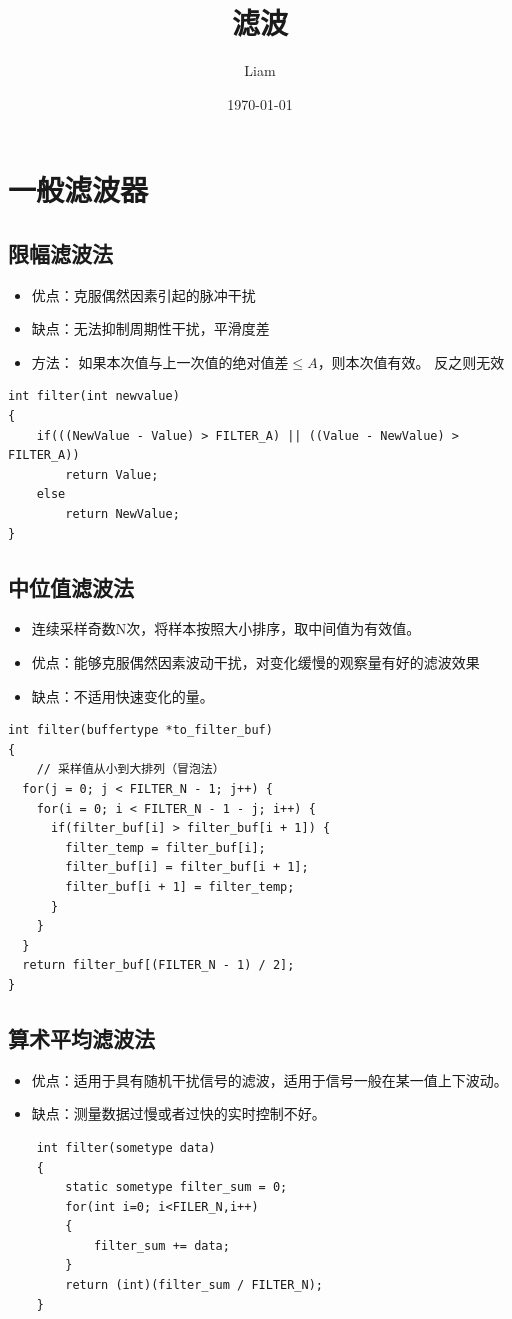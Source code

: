 \documentclass[12pt]{ctexart}
\title{滤波}
\author{Liam}
\date{\today}
\begin{document}
\maketitle
\section{一般滤波器}
\subsection{限幅滤波法}
\begin{itemize}
    \item 优点：克服偶然因素引起的脉冲干扰
    \item 缺点：无法抑制周期性干扰，平滑度差
    \item 方法： 
    \subitem 如果本次值与上一次值的绝对值差$\leq A$，则本次值有效。
    \subitem 反之则无效  
\end{itemize}
\begin{lstlisting}
int filter(int newvalue)
{
    if(((NewValue - Value) > FILTER_A) || ((Value - NewValue) > FILTER_A))
        return Value;
    else
        return NewValue;
}
\end{lstlisting}
\subsection{中位值滤波法}
\begin{itemize}
    \item 连续采样奇数N次，将样本按照大小排序，取中间值为有效值。
    \item 优点：能够克服偶然因素波动干扰，对变化缓慢的观察量有好的滤波效果
    \item 缺点：不适用快速变化的量。
\end{itemize}
\begin{lstlisting}
int filter(buffertype *to_filter_buf)
{
    // 采样值从小到大排列（冒泡法）
  for(j = 0; j < FILTER_N - 1; j++) {
    for(i = 0; i < FILTER_N - 1 - j; i++) {
      if(filter_buf[i] > filter_buf[i + 1]) {
        filter_temp = filter_buf[i];
        filter_buf[i] = filter_buf[i + 1];
        filter_buf[i + 1] = filter_temp;
      }
    }
  }
  return filter_buf[(FILTER_N - 1) / 2];
}
\end{lstlisting}

\subsection{算术平均滤波法}
\begin{itemize}
    \item 优点：适用于具有随机干扰信号的滤波，适用于信号一般在某一值上下波动。
    \item 缺点：测量数据过慢或者过快的实时控制不好。
\end{itemize}
\begin{lstlisting}
    int filter(sometype data)
    {
        static sometype filter_sum = 0;
        for(int i=0; i<FILER_N,i++)
        {
            filter_sum += data;
        }
        return (int)(filter_sum / FILTER_N);
    }
\end{lstlisting}
\end{document}
